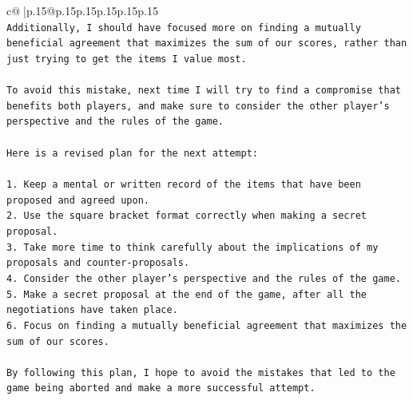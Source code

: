 \documentclass{article}
\begin{document}
{\begin{supertabular}{c@{$\;$}|p{.15\linewidth}@{}p{.15\linewidth}p{.15\linewidth}p{.15\linewidth}p{.15\linewidth}p{.15\linewidth}}
{{{\\ 
\texttt{Additionally, I should have focused more on finding a mutually beneficial agreement that maximizes the sum of our scores, rather than just trying to get the items I value most.} \\
\\ 
\texttt{To avoid this mistake, next time I will try to find a compromise that benefits both players, and make sure to consider the other player's perspective and the rules of the game.} \\
\\ 
\texttt{Here is a revised plan for the next attempt:} \\
\\ 
\texttt{1. Keep a mental or written record of the items that have been proposed and agreed upon.} \\
\texttt{2. Use the square bracket format correctly when making a secret proposal.} \\
\texttt{3. Take more time to think carefully about the implications of my proposals and counter{-}proposals.} \\
\texttt{4. Consider the other player's perspective and the rules of the game.} \\
\texttt{5. Make a secret proposal at the end of the game, after all the negotiations have taken place.} \\
\texttt{6. Focus on finding a mutually beneficial agreement that maximizes the sum of our scores.} \\
\\ 
\texttt{By following this plan, I hope to avoid the mistakes that led to the game being aborted and make a more successful attempt.} \\
            }
        }
    }
     \\ \\

\end{supertabular}
}
\end{document}
